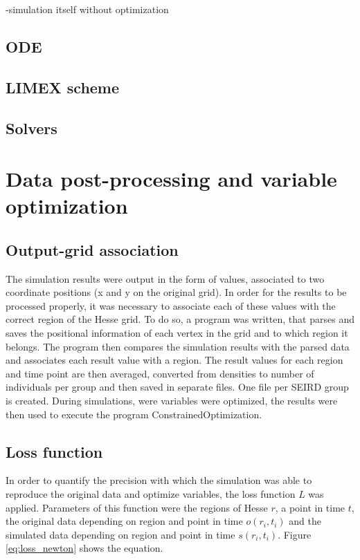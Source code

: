 -simulation itself without optimization

\subsection{ODE}


\subsection{LIMEX scheme}


\subsection{Solvers}


\section{Data post-processing and variable optimization}

\subsection{Output-grid association}
The simulation results were output in the form of values, associated to two coordinate positions (x and y on the
original grid). In order for the results to be processed properly, it was necessary to associate each of these
values with the correct region of the Hesse grid. To do so, a program was written, that parses and saves the positional
information of each vertex in the grid and to which region it belongs. The program then compares the simulation results
with the parsed data and associates each result value with a region. The result values for each region and time point
are then averaged, converted from densities to number of individuals per group and then saved in separate files.
One file per SEIRD group is created. During simulations, were variables were optimized, the results were then used to
execute the program ConstrainedOptimization.


\subsection{Loss function}
In order to quantify the precision with which the simulation was able to reproduce the original data and optimize variables, the loss function $L$
was applied. Parameters of this function were the regions of Hesse $r$, a point in time $t$, the original data depending on
region and point in time $o(r_i,t_i)$ and the simulated data depending on region and point in time $s(r_i, t_i)$. Figure \ref*{eq:loss_newton}
shows the equation.

